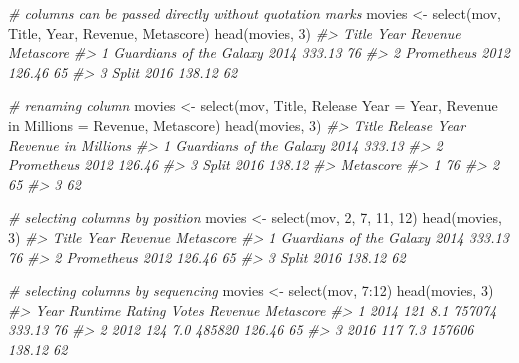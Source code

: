 \documentclass[
]{book}
\newenvironment{Shaded}{\begin{snugshade}}{\end{snugshade}}
\newcommand{\AttributeTok}[1]{\textcolor[rgb]{0.77,0.63,0.00}{#1}}
\newcommand{\CommentTok}[1]{\textcolor[rgb]{0.56,0.35,0.01}{\textit{#1}}}
\newcommand{\DecValTok}[1]{\textcolor[rgb]{0.00,0.00,0.81}{#1}}
\newcommand{\FunctionTok}[1]{\textcolor[rgb]{0.00,0.00,0.00}{#1}}
\newcommand{\NormalTok}[1]{#1}
\newcommand{\OtherTok}[1]{\textcolor[rgb]{0.56,0.35,0.01}{#1}}
\newcommand{\SpecialCharTok}[1]{\textcolor[rgb]{0.00,0.00,0.00}{#1}}
\newcommand{\StringTok}[1]{\textcolor[rgb]{0.31,0.60,0.02}{#1}}
\begin{document}
\begin{Shaded}
\begin{Highlighting}[]
\CommentTok{\# columns can be passed directly without quotation marks}
\NormalTok{movies }\OtherTok{\textless{}{-}} \FunctionTok{select}\NormalTok{(mov, Title, Year, Revenue, Metascore)}
\FunctionTok{head}\NormalTok{(movies, }\DecValTok{3}\NormalTok{)}
\CommentTok{\#\textgreater{}                     Title Year Revenue Metascore}
\CommentTok{\#\textgreater{} 1 Guardians of the Galaxy 2014  333.13        76}
\CommentTok{\#\textgreater{} 2              Prometheus 2012  126.46        65}
\CommentTok{\#\textgreater{} 3                   Split 2016  138.12        62}

\CommentTok{\# renaming column}
\NormalTok{movies }\OtherTok{\textless{}{-}} \FunctionTok{select}\NormalTok{(mov, }
\NormalTok{                 Title, }
                 \StringTok{\textasciigrave{}}\AttributeTok{Release Year}\StringTok{\textasciigrave{}} \OtherTok{=}\NormalTok{ Year, }
                 \StringTok{\textasciigrave{}}\AttributeTok{Revenue in Millions}\StringTok{\textasciigrave{}} \OtherTok{=}\NormalTok{ Revenue, }
\NormalTok{                 Metascore)}
\FunctionTok{head}\NormalTok{(movies, }\DecValTok{3}\NormalTok{)}
\CommentTok{\#\textgreater{}                     Title Release Year Revenue in Millions}
\CommentTok{\#\textgreater{} 1 Guardians of the Galaxy         2014              333.13}
\CommentTok{\#\textgreater{} 2              Prometheus         2012              126.46}
\CommentTok{\#\textgreater{} 3                   Split         2016              138.12}
\CommentTok{\#\textgreater{}   Metascore}
\CommentTok{\#\textgreater{} 1        76}
\CommentTok{\#\textgreater{} 2        65}
\CommentTok{\#\textgreater{} 3        62}

\CommentTok{\# selecting columns by position}
\NormalTok{movies }\OtherTok{\textless{}{-}} \FunctionTok{select}\NormalTok{(mov, }\DecValTok{2}\NormalTok{, }\DecValTok{7}\NormalTok{, }\DecValTok{11}\NormalTok{, }\DecValTok{12}\NormalTok{)}
\FunctionTok{head}\NormalTok{(movies, }\DecValTok{3}\NormalTok{)}
\CommentTok{\#\textgreater{}                     Title Year Revenue Metascore}
\CommentTok{\#\textgreater{} 1 Guardians of the Galaxy 2014  333.13        76}
\CommentTok{\#\textgreater{} 2              Prometheus 2012  126.46        65}
\CommentTok{\#\textgreater{} 3                   Split 2016  138.12        62}

\CommentTok{\# selecting columns by sequencing}
\NormalTok{movies }\OtherTok{\textless{}{-}} \FunctionTok{select}\NormalTok{(mov, }\DecValTok{7}\SpecialCharTok{:}\DecValTok{12}\NormalTok{)}
\FunctionTok{head}\NormalTok{(movies, }\DecValTok{3}\NormalTok{)}
\CommentTok{\#\textgreater{}   Year Runtime Rating  Votes Revenue Metascore}
\CommentTok{\#\textgreater{} 1 2014     121    8.1 757074  333.13        76}
\CommentTok{\#\textgreater{} 2 2012     124    7.0 485820  126.46        65}
\CommentTok{\#\textgreater{} 3 2016     117    7.3 157606  138.12        62}


\end{Highlighting}
\end{Shaded}
\end{document}
